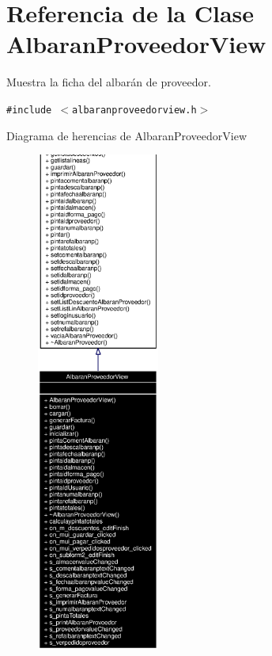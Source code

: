 \section{Referencia de la Clase Albaran\-Proveedor\-View}
\label{classAlbaranProveedorView}
Muestra la ficha del albar\'{a}n de proveedor.  


{\tt \#include $<$albaranproveedorview.h$>$}

Diagrama de herencias de Albaran\-Proveedor\-View\begin{figure}[H]
\begin{center}
\leavevmode
\includegraphics[width=114pt]{classAlbaranProveedorView__inherit__graph}
\end{center}
\end{figure}
